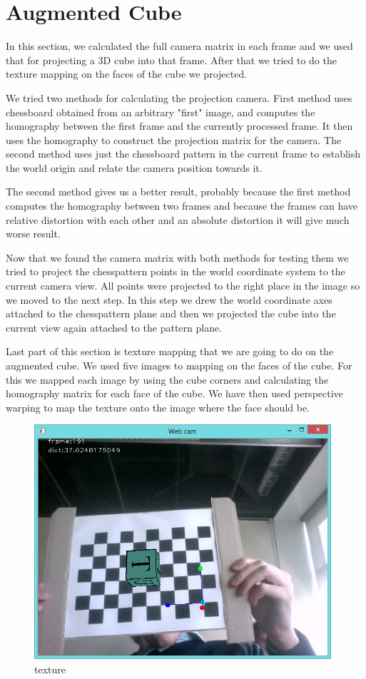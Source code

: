 \section{Augmented Cube}
In this section, we calculated the full camera matrix in each frame and we used that for projecting a 3D cube into that frame. After that we tried to do the texture mapping on the faces of the cube we projected.

We tried two methods for calculating the projection camera. First method uses chessboard obtained from an arbitrary "first" image, and computes the homography between the first frame and the currently processed frame. It then uses the homography to construct the projection matrix for the camera. The second method uses just the chessboard pattern in the current frame to establish the world origin and relate the camera position towards it.

The second method gives us a better result, probably because the first method computes the homography between two frames and because the frames can have relative distortion with each other and an absolute distortion it will give much worse result.

Now that we found the camera matrix with both methods for testing them we tried to project the chesspattern points in the world coordinate system to the current camera view. All points were projected to the right place in the image so we moved to the next step.
In this step we drew the world coordinate axes attached to the chesspattern plane and then we projected the cube into the current view again attached to the pattern plane.

Last part of this section is texture mapping that we are going to do on the augmented cube. We used five images to mapping on the faces of the cube. For this we mapped each image by using the cube corners and calculating the homography matrix for each face of the cube. We have then used perspective warping to map the texture onto the image where the face should be.

 \begin{figure}[h!]
	\centering
	\includegraphics[width=11cm]{Handin3/images/texture.jpg}
	\caption{texture}
	\label{fig:texture}
\end{figure}

